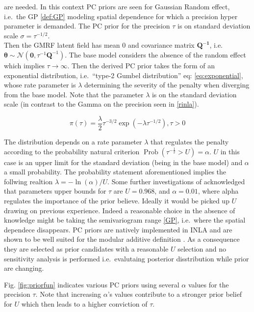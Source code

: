 \documentclass[
  12pt,
  a4paper,
  oneside]{book}
\theoremstyle{definition}
\theoremstyle{definition}
\theoremstyle{definition}
\theoremstyle{remark}
\begin{document}
are needed. In this context PC priors are seen for Gaussian Random effect, i.e.~the GP \ref{def:GP} modeling spatial dependence for which a precision hyper parameter is demanded. The PC prior for the precision \(\tau\) is on standard deviation scale \(\sigma=\tau^{-1 / 2}\).\\
Then the GMRF latent field has mean 0 and covariance matrix \(\boldsymbol{Q^{-1}}\), i.e.~\(\boldsymbol{\theta} \sim \mathcal{N}\left(\mathbf{0}, \tau^{-1} \boldsymbol{Q}^{-1}\right)\). The base model considers the absence of the random effect which implies \(\tau \rightarrow \infty\). Then the derived PC prior \citep{simpson2017} takes the form of an exponential distribution, i.e.~``type-2 Gumbel distribution'' eq: \eqref{eq:exponential}, whose rate parameter is \(\lambda\) determining the severity of the penalty when diverging from the base model. Note that the parameter \(\lambda\) is on the standard deviation scale (in contrast to the Gamma on the precision seen in \ref{rinla}).

\begin{equation}
  \pi(\tau)=\frac{\lambda}{2} \tau^{-3 / 2} \exp \left(-\lambda \tau^{-1 / 2}\right), \tau>0
\label{eq:exponential}
\end{equation}

The distribution depends on a rate parameter \(\lambda\) that regulates the penalty according to the probability natural criterion \citep{slides} \(\operatorname{Prob}(\tau^{-\frac{1}{2}} > U)=\alpha\). \(U\) in this case is an upper limit for the standard deviation (being in the base model) and \(\alpha\) a small probability. The probability statement aforementioned implies the follwing realtion \(\lambda=-\ln (\alpha) / U\). Some further investigations of \citet{simpson2017} acknowledged that parameters upper bounds for \(\tau\) are \(U = 0.968\), and \(\alpha = 0.01\), where alpha regulates the importance of the prior believe. Ideally it would be picked up \(U\) drawing on previous experience. Indeed a reasonable choice in the absence of knowledge might be taking the semivariogram range \ref{GP}, i.e.~where the spatial dependece disappears. PC priors are natively implemented in INLA and are shown to be well suited for the modular additive definition \citep{Bayesian_INLA_Rubio}. As a consequence they are selected as prior candidates with a reasonable \(U\) selection and no sensitivity analysis is performed i.e.~evalutaing posterior disstribution while prior are changing.

Fig. \ref{fig:priorfun} indicates various PC priors using several \(\alpha\) values for the precision \(\tau\). Note that increasing \(\alpha\)'s values contribute to a stronger prior belief for \(U\) which then leads to a higher conviction of \(\tau\).
\end{document}
